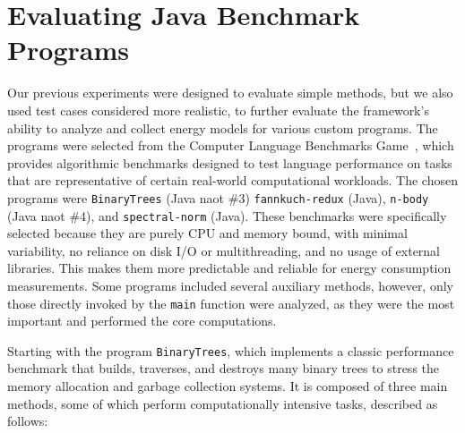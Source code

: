 

\section{Evaluating Java Benchmark Programs} \label{sec:evaluating_java_benchmark_programs}

Our previous experiments were designed to evaluate simple methods, but we also used test cases considered more realistic, to further evaluate the framework’s ability to analyze and collect energy models for various custom programs. The programs were selected from the Computer Language Benchmarks Game~\cite{benchmarksGameJava}, which provides algorithmic benchmarks designed to test language performance on tasks that are representative of certain real-world computational workloads. The chosen programs were \texttt{BinaryTrees} (Java naot \#3) \texttt{fannkuch-redux} (Java), \texttt{n-body} (Java naot \#4), and \texttt{spectral-norm} (Java). These benchmarks were specifically selected because they are purely CPU and memory bound, with minimal variability, no reliance on disk I/O or multithreading, and no usage of external libraries. This makes them more predictable and reliable for energy consumption measurements. Some programs included several auxiliary methods, however, only those directly invoked by the \texttt{main} function were analyzed, as they were the most important and performed the core computations.


{\color{blue}Starting with the program \texttt{BinaryTrees}, which implements a classic performance benchmark that builds, traverses, and destroys many binary trees to stress the memory allocation and garbage collection systems. It is composed of three main methods, some of which perform computationally intensive tasks, described as follows:}

